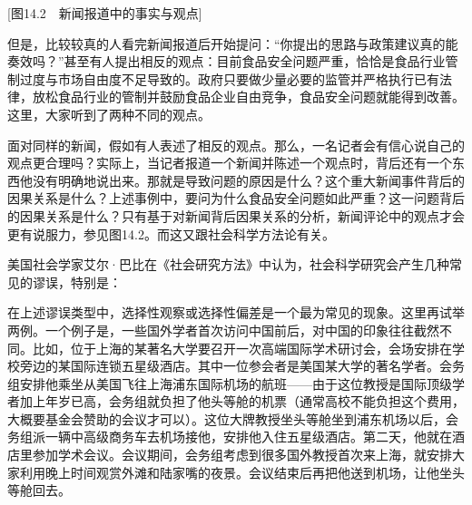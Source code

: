 [图14.2　新闻报道中的事实与观点]

但是，比较较真的人看完新闻报道后开始提问：“你提出的思路与政策建议真的能奏效吗？”甚至有人提出相反的观点：目前食品安全问题严重，恰恰是食品行业管制过度与市场自由度不足导致的。政府只要做少量必要的监管并严格执行已有法律，放松食品行业的管制并鼓励食品企业自由竞争，食品安全问题就能得到改善。这里，大家听到了两种不同的观点。

面对同样的新闻，假如有人表述了相反的观点。那么，一名记者会有信心说自己的观点更合理吗？实际上，当记者报道一个新闻并陈述一个观点时，背后还有一个东西他没有明确地说出来。那就是导致问题的原因是什么？这个重大新闻事件背后的因果关系是什么？上述事例中，要问为什么食品安全问题如此严重？这一问题背后的因果关系是什么？只有基于对新闻背后因果关系的分析，新闻评论中的观点才会更有说服力，参见图14.2。而这又跟社会科学方法论有关。


美国社会学家艾尔·巴比在《社会研究方法》中认为，社会科学研究会产生几种常见的谬误，特别是：


在上述谬误类型中，选择性观察或选择性偏差是一个最为常见的现象。这里再试举两例。一个例子是，一些国外学者首次访问中国前后，对中国的印象往往截然不同。比如，位于上海的某著名大学要召开一次高端国际学术研讨会，会场安排在学校旁边的某国际连锁五星级酒店。其中一位参会者是美国某大学的著名学者。会务组安排他乘坐从美国飞往上海浦东国际机场的航班——由于这位教授是国际顶级学者加上年岁已高，会务组就负担了他头等舱的机票（通常高校不能负担这个费用，大概要基金会赞助的会议才可以）。这位大牌教授坐头等舱坐到浦东机场以后，会务组派一辆中高级商务车去机场接他，安排他入住五星级酒店。第二天，他就在酒店里参加学术会议。会议期间，会务组考虑到很多国外教授首次来上海，就安排大家利用晚上时间观赏外滩和陆家嘴的夜景。会议结束后再把他送到机场，让他坐头等舱回去。

